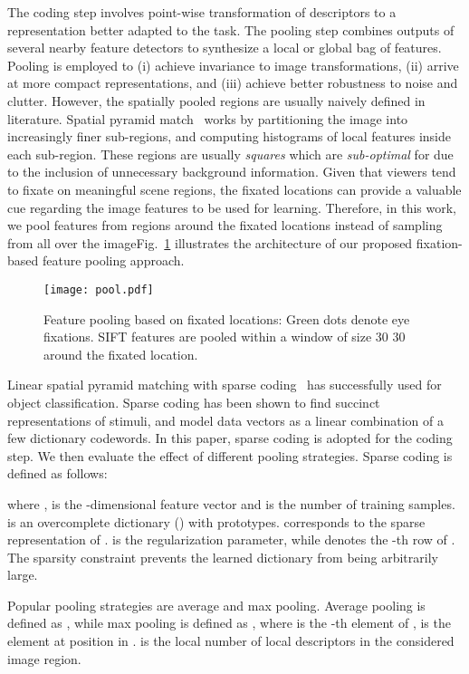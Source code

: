\documentclass{article}
\begin{document}
The coding step involves point-wise transformation of descriptors to a representation better adapted to the task. The pooling step combines outputs of several nearby feature detectors to synthesize a local or global bag of features. Pooling is employed to (i) achieve invariance to image transformations, (ii) arrive at more compact representations, and (iii) achieve better robustness to noise and clutter. However, the spatially pooled regions are usually naively defined in literature. Spatial pyramid match~\cite{Yang09CVPR} works by partitioning the image into increasingly finer sub-regions, and computing histograms of local features inside each sub-region. These regions are usually \textit{squares} which are \textit{sub-optimal} for due to the inclusion of unnecessary background information. Given that viewers tend to fixate on meaningful scene regions, the fixated locations can provide a valuable cue regarding the image features to be used for learning. Therefore, in this work, we pool features from regions around the fixated locations instead of sampling from all over the imageFig.~\ref{fig:pool} illustrates the architecture of our proposed fixation-based feature pooling approach.

\begin{figure}[htbp]
\texttt{[image: pool.pdf]}\vspace{-0.02in}
\caption{Feature pooling based on fixated locations: Green dots denote eye fixations. SIFT features are pooled within a window of size 30  30 around the fixated location.}
\label{fig:pool}
\end{figure}

Linear spatial pyramid matching with sparse coding~\cite{Yang09CVPR} has successfully used for object classification. Sparse coding has been shown to find succinct representations of stimuli, and model data vectors as a linear combination of a few dictionary codewords. In this paper, sparse coding is adopted for the coding step. We then evaluate the effect of different pooling strategies. Sparse coding is defined as follows:



\noindent where ,  is the -dimensional feature vector and  is the number of training samples.  is an overcomplete dictionary () with  prototypes.  corresponds to the sparse representation of .  is the regularization parameter, while  denotes the -th row of . The sparsity constraint prevents the learned dictionary from being arbitrarily large.

Popular pooling strategies are average and max pooling. Average pooling is defined as , while max pooling
is defined as , where  is the -th element of ,  is the element at position  in .  is the local number of local descriptors in the considered image region.
\end{document}
